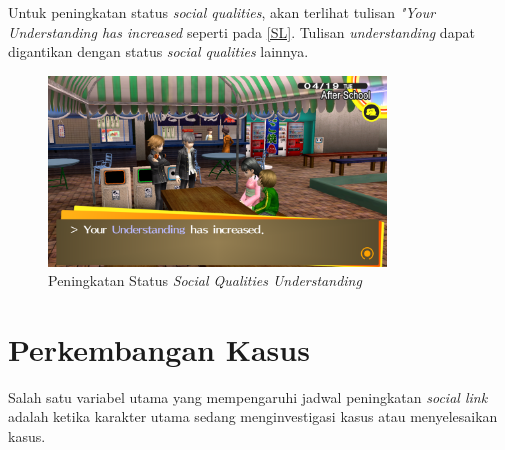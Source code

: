 Untuk peningkatan status \textit{social qualities}, akan terlihat tulisan \textit{"Your Understanding has increased} seperti pada \autoref{SL}. Tulisan \textit{understanding} dapat digantikan dengan status \textit{social qualities} lainnya.
\begin{figure}[htbp]
    \centering
    \includegraphics[width=0.8\textwidth]{resources/Dokumentasi/Screenshot (379).png}
    \caption{\label{SL}Peningkatan Status \textit{Social Qualities Understanding}}
\end{figure}

\section{Perkembangan Kasus}
Salah satu variabel utama yang mempengaruhi jadwal peningkatan \textit{social link} adalah ketika karakter utama sedang menginvestigasi kasus atau menyelesaikan kasus.


